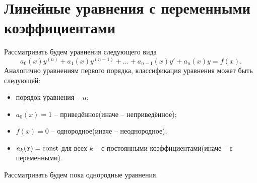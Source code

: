 \section{Линейные уравнения с переменными коэффициентами}

    Рассматривать будем уравнения следующего вида
    \[
        a_0(x) y^{(n)} + a_1(x) y^{(n - 1)} + \dots + a_{n - 1}(x) y' + a_n(x) y = f(x).
    \]
    Аналогично уравнениям первого порядка, классификация уравнения может быть следующей:
    \begin{itemize}
        \item порядок уравнения -- $ n $;
        \item $ a_0(x) = 1 $ -- приведённое(иначе -- неприведённое);
        \item $ f(x) = 0 $ -- однородное(иначе -- неоднородное);
        \item $ a_k(x) = \mathrm{const} $ для всех $ k $ -- с постоянными коэффициентами(иначе -- с переменными).
    \end{itemize}
    Рассматривать будем пока однородные уравнения.

